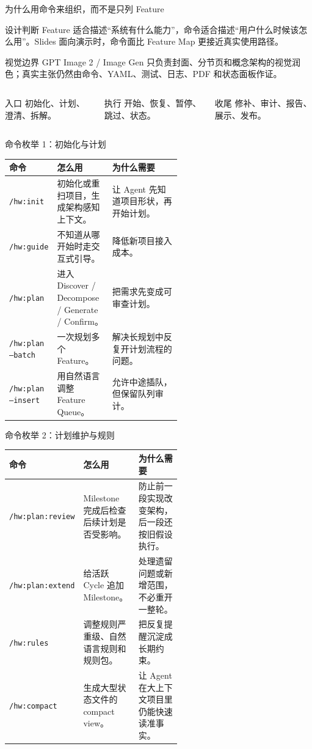 \documentclass[theme=workflow,aspectratio=169,fontset=tech]{Hypo-Slide}
\newcommand{\CommandRow}[3]{\texttt{#1} & #2 & #3 \\}
\begin{document}
\begin{frame}{为什么用命令来组织，而不是只列 Feature}
  \begin{block}{设计判断}
    Feature 适合描述“系统有什么能力”，命令适合描述“用户什么时候该怎么用”。Slides 面向演示时，命令面比 Feature Map 更接近真实使用路径。
  \end{block}
  \begin{alertblock}{视觉边界}
    GPT Image 2 / Image Gen 只负责封面、分节页和概念架构的视觉润色；真实主张仍然由命令、YAML、测试、日志、PDF 和状态面板作证。
  \end{alertblock}
  \begin{columns}[T,totalwidth=\textwidth]
    \begin{block}{入口}
      初始化、计划、澄清、拆解。
    \end{block}
    \begin{block}{执行}
      开始、恢复、暂停、跳过、状态。
    \end{block}
    \begin{block}{收尾}
      修补、审计、报告、展示、发布。
    \end{block}
  \end{columns}
\end{frame}

\begin{frame}{命令枚举 1：初始化与计划}
  \scriptsize
  \begin{tabularx}{\textwidth}{p{0.24\linewidth}p{0.32\linewidth}X}
    \toprule
    命令 & 怎么用 & 为什么需要 \\
    \midrule
    \CommandRow{/hw:init}{初始化或重扫项目，生成架构感知上下文。}{让 Agent 先知道项目形状，再开始计划。}
    \CommandRow{/hw:guide}{不知道从哪开始时走交互式引导。}{降低新项目接入成本。}
    \CommandRow{/hw:plan}{进入 Discover / Decompose / Generate / Confirm。}{把需求先变成可审查计划。}
    \CommandRow{/hw:plan --batch}{一次规划多个 Feature。}{解决长规划中反复开计划流程的问题。}
    \CommandRow{/hw:plan --insert}{用自然语言调整 Feature Queue。}{允许中途插队，但保留队列审计。}
    \bottomrule
  \end{tabularx}
\end{frame}

\begin{frame}{命令枚举 2：计划维护与规则}
  \scriptsize
  \begin{tabularx}{\textwidth}{p{0.24\linewidth}p{0.32\linewidth}X}
    \toprule
    命令 & 怎么用 & 为什么需要 \\
    \midrule
    \CommandRow{/hw:plan:review}{Milestone 完成后检查后续计划是否受影响。}{防止前一段实现改变架构，后一段还按旧假设执行。}
    \CommandRow{/hw:plan:extend}{给活跃 Cycle 追加 Milestone。}{处理遗留问题或新增范围，不必重开一整轮。}
    \CommandRow{/hw:rules}{调整规则严重级、自然语言规则和规则包。}{把反复提醒沉淀成长期约束。}
    \CommandRow{/hw:compact}{生成大型状态文件的 compact view。}{让 Agent 在大上下文项目里仍能快速读准事实。}
    \bottomrule
  \end{tabularx}
\end{frame}
\end{document}
